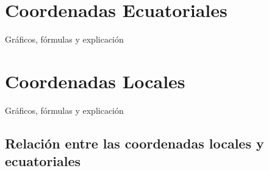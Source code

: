 
\section{Coordenadas Ecuatoriales}\label{apendice:ecuatorial}

Gráficos, fórmulas y explicación

\section{Coordenadas Locales} \label{apendice:local}

Gráficos, fórmulas y explicación

\subsection{Relación entre las coordenadas locales y ecuatoriales} \label{cambio_coord}
